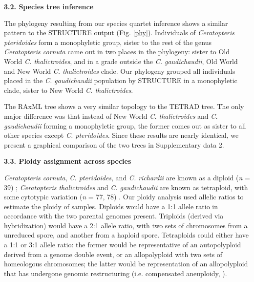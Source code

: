 \documentclass[12pt]{article}
\begin{document}
\begin{flushleft}
\textbf{3.2. Species tree inference}

 The phylogeny resulting from our species quartet inference shows a similar pattern to the {\small{STRUCTURE}} output (Fig. \ref{phy}). Individuals of \textit{Ceratopteris pteridoides} form a monophyletic group, sister to the rest of the genus \textit{Ceratopteris cornuta} came out in two places in the phylogeny: sister to Old World \textit{C. thalictroides}, and in a grade outside the \textit{C. gaudichaudii}, Old World and New World \textit{C. thalictroides} clade. Our phylogeny grouped all individuals placed in the \textit{C. gaudichaudii} population by {\small{STRUCTURE}} in a monophyletic clade, sister to New World \textit{C. thalictroides}. 
 
 The {\small{RAxML}} tree shows a very similar topology to the {\small{TETRAD}} tree. The only major difference was that instead of New World \textit{C. thalictroides} and \textit{C. gaudichaudii} forming a monophyletic group, the former comes out as sister to all other species except \textit{C. pteridoides}. Since these results are nearly identical, we present a graphical comparison of the two trees in Supplementary data 2.  

\textbf{3.3. Ploidy assignment across species}

\textit{Ceratopteris cornuta}, \textit{C. pteridoides}, and \textit{C. richardii} are known as a diploid (\textit{n} = 39) \autocite{Adjie2007, Hickok1977}; \textit{Ceratopteris thalictroides} and \textit{C. gaudichaudii} are known as tetraploid, with some cytotypic variation (\textit{n} = 77, 78) \autocite{Adjie2007, Masuyama2010}. Our ploidy analysis used allelic ratios to estimate the ploidy of samples. Diploids would have a 1:1 allele ratio in accordance with the two parental genomes present. Triploids (derived via hybridization) would have a 2:1 allele ratio, with two sets of chromosomes from a unreduced spore, and another from a haploid spore. Tetraploids could either have a 1:1 or 3:1 allele ratio: the former would be representative of an autopolyploid derived from a genome double event, or an allopolyploid with two sets of homeologous chromosomes; the latter would be representation of an allopolyploid that has undergone genomic restructuring (i.e. compensated aneuploidy, \cite{Sigel2016}). 


\end{flushleft}
\end{document}

